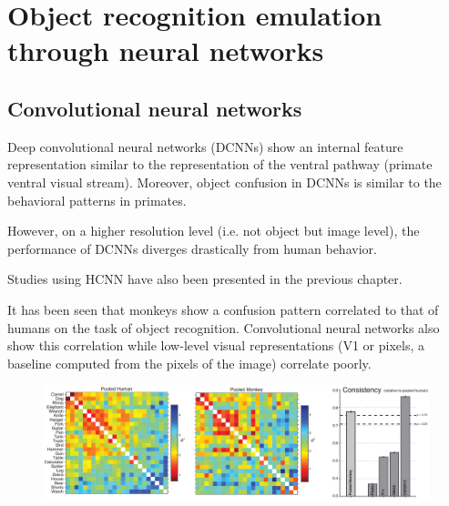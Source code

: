 \chapter{Object recognition emulation through neural networks}


\section{Convolutional neural networks}

Deep convolutional neural networks (DCNNs) show an internal feature representation similar to the representation of the ventral pathway (primate ventral visual stream).
Moreover, object confusion in DCNNs is similar to the behavioral patterns in primates.

However, on a higher resolution level (i.e. not object but image level), the performance of DCNNs diverges drastically from human behavior.

\begin{remark}
    Studies using HCNN have also been presented in the previous chapter.
\end{remark}

\begin{casestudy}
    It has been seen that monkeys show a confusion pattern correlated to that of humans on the task of object recognition.
    Convolutional neural networks also show this correlation while low-level visual representations (V1 or pixels, a baseline computed from the pixels of the image)
    correlate poorly.
    \begin{figure}[H]
        \centering
        \includegraphics[width=0.8\linewidth]{./img/human_monkey_confusion.png}
    \end{figure} 
\end{casestudy}

